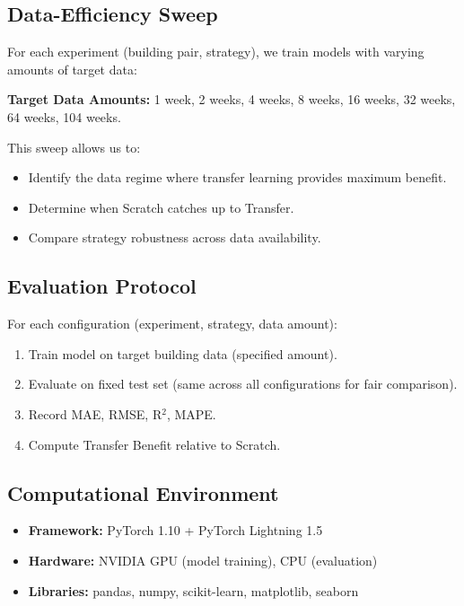 \documentclass[12pt,a4paper]{report}
\begin{document}
\subsection{Data-Efficiency Sweep}

For each experiment (building pair, strategy), we train models with varying amounts of target data:

\textbf{Target Data Amounts:} 1 week, 2 weeks, 4 weeks, 8 weeks, 16 weeks, 32 weeks, 64 weeks, 104 weeks.

This sweep allows us to:
\begin{itemize}
    \item Identify the data regime where transfer learning provides maximum benefit.
    \item Determine when Scratch catches up to Transfer.
    \item Compare strategy robustness across data availability.
\end{itemize}

\subsection{Evaluation Protocol}

For each configuration (experiment, strategy, data amount):

\begin{enumerate}
    \item Train model on target building data (specified amount).
    \item Evaluate on fixed test set (same across all configurations for fair comparison).
    \item Record MAE, RMSE, R$^2$, MAPE.
    \item Compute Transfer Benefit relative to Scratch.
\end{enumerate}

\subsection{Computational Environment}

\begin{itemize}
    \item \textbf{Framework:} PyTorch 1.10 + PyTorch Lightning 1.5
    \item \textbf{Hardware:} NVIDIA GPU (model training), CPU (evaluation)
    \item \textbf{Libraries:} pandas, numpy, scikit-learn, matplotlib, seaborn
\end{itemize}
\end{document}
